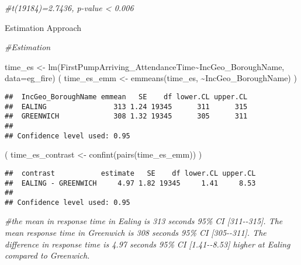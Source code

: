 \documentclass[
]{article}
\newenvironment{Shaded}{\begin{snugshade}}{\end{snugshade}}
\newcommand{\AttributeTok}[1]{\textcolor[rgb]{0.77,0.63,0.00}{#1}}
\newcommand{\CommentTok}[1]{\textcolor[rgb]{0.56,0.35,0.01}{\textit{#1}}}
\newcommand{\FunctionTok}[1]{\textcolor[rgb]{0.00,0.00,0.00}{#1}}
\newcommand{\NormalTok}[1]{#1}
\newcommand{\OtherTok}[1]{\textcolor[rgb]{0.56,0.35,0.01}{#1}}
\newcommand{\SpecialCharTok}[1]{\textcolor[rgb]{0.00,0.00,0.00}{#1}}
\begin{document}
\begin{Shaded}
\begin{Highlighting}[]
\CommentTok{\#t(19184)=2.7436, p{-}value \textless{} 0.006}
\end{Highlighting}
\end{Shaded}

Estimation Approach

\begin{Shaded}
\begin{Highlighting}[]
\CommentTok{\#Estimation}

\NormalTok{time\_es }\OtherTok{\textless{}{-}} \FunctionTok{lm}\NormalTok{(FirstPumpArriving\_AttendanceTime}\SpecialCharTok{\textasciitilde{}}\NormalTok{IncGeo\_BoroughName, }\AttributeTok{data=}\NormalTok{eg\_fire)}
\NormalTok{(  time\_es\_emm }\OtherTok{\textless{}{-}} \FunctionTok{emmeans}\NormalTok{(time\_es, }\SpecialCharTok{\textasciitilde{}}\NormalTok{IncGeo\_BoroughName)  )}
\end{Highlighting}
\end{Shaded}

\begin{verbatim}
##  IncGeo_BoroughName emmean   SE    df lower.CL upper.CL
##  EALING                313 1.24 19345      311      315
##  GREENWICH             308 1.32 19345      305      311
## 
## Confidence level used: 0.95
\end{verbatim}

\begin{Shaded}
\begin{Highlighting}[]
\NormalTok{(  time\_es\_contrast }\OtherTok{\textless{}{-}} \FunctionTok{confint}\NormalTok{(}\FunctionTok{pairs}\NormalTok{(time\_es\_emm))  )}
\end{Highlighting}
\end{Shaded}

\begin{verbatim}
##  contrast           estimate   SE    df lower.CL upper.CL
##  EALING - GREENWICH     4.97 1.82 19345     1.41     8.53
## 
## Confidence level used: 0.95
\end{verbatim}

\begin{Shaded}
\begin{Highlighting}[]
\CommentTok{\#the mean in response time in Ealing is 313 seconds 95\% CI [311{-}{-}315]. The mean response time in Greenwich is 308 seconds 95\% CI [305{-}{-}311]. The difference in response time is 4.97 seconds 95\% CI [1.41{-}{-}8.53] higher at Ealing compared to Greenwich.}
\end{Highlighting}
\end{Shaded}
\end{document}

